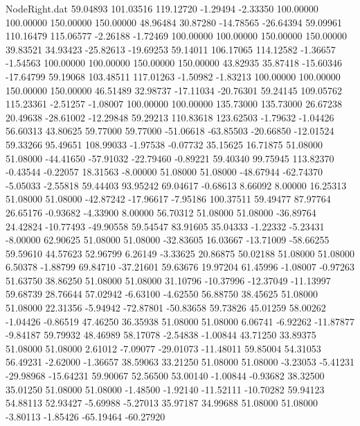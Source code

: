 \begin{filecontents}{NodeRight.dat}
  59.04893  101.03516  119.12720    -1.29494   -2.33350  100.00000  100.00000  150.00000  150.00000   48.96484   30.87280  -14.78565  -26.64394
  59.09961  110.16479  115.06577    -2.26188   -1.72469  100.00000  100.00000  150.00000  150.00000   39.83521   34.93423  -25.82613  -19.69253
  59.14011  106.17065  114.12582    -1.36657   -1.54563  100.00000  100.00000  150.00000  150.00000   43.82935   35.87418  -15.60346  -17.64799
  59.19068  103.48511  117.01263    -1.50982   -1.83213  100.00000  100.00000  150.00000  150.00000   46.51489   32.98737  -17.11034  -20.76301
  59.24145  109.05762  115.23361    -2.51257   -1.08007  100.00000  100.00000  135.73000  135.73000   26.67238   20.49638  -28.61002  -12.29848
  59.29213  110.83618  123.62503    -1.79632   -1.04426   56.60313   43.80625   59.77000   59.77000  -51.06618  -63.85503  -20.66850  -12.01524
  59.33266   95.49651  108.99033    -1.97538   -0.07732   35.15625   16.71875   51.08000   51.08000  -44.41650  -57.91032  -22.79460   -0.89221
  59.40340   99.75945  113.82370    -0.43544   -0.22057   18.31563   -8.00000   51.08000   51.08000  -48.67944  -62.74370   -5.05033   -2.55818
  59.44403   93.95242   69.04617    -0.68613    8.66092    8.00000   16.25313   51.08000   51.08000  -42.87242  -17.96617   -7.95186  100.37511
  59.49477   87.97764   26.65176    -0.93682   -4.33900    8.00000   56.70312   51.08000   51.08000  -36.89764   24.42824  -10.77493  -49.90558
  59.54547   83.91605   35.04333    -1.22332   -5.23431   -8.00000   62.90625   51.08000   51.08000  -32.83605   16.03667  -13.71009  -58.66255
  59.59610   44.57623   52.96799     6.26149   -3.33625   20.86875   50.02188   51.08000   51.08000    6.50378   -1.88799   69.84710  -37.21601
  59.63676   19.97204   61.45996    -1.08007   -0.97263   51.63750   38.86250   51.08000   51.08000   31.10796  -10.37996  -12.37049  -11.13997
  59.68739   28.76644   57.02942    -6.63100   -4.62550   56.88750   38.45625   51.08000   51.08000   22.31356   -5.94942  -72.87801  -50.83658
  59.73826   45.01259   58.00262    -1.04426   -0.86519   47.46250   36.35938   51.08000   51.08000    6.06741   -6.92262  -11.87877   -9.84187
  59.79932   48.46989   58.17078    -2.54838   -1.00844   43.71250   33.89375   51.08000   51.08000    2.61012   -7.09077  -29.01073  -11.48011
  59.85004   54.31053   56.49231    -2.62000   -1.36657   38.59063   33.21250   51.08000   51.08000   -3.23053   -5.41231  -29.98968  -15.64231
  59.90067   52.56500   53.00140    -1.00844   -0.93682   38.32500   35.01250   51.08000   51.08000   -1.48500   -1.92140  -11.52111  -10.70282
  59.94123   54.88113   52.93427    -5.69988   -5.27013   35.97187   34.99688   51.08000   51.08000   -3.80113   -1.85426  -65.19464  -60.27920

\end{filecontents}
